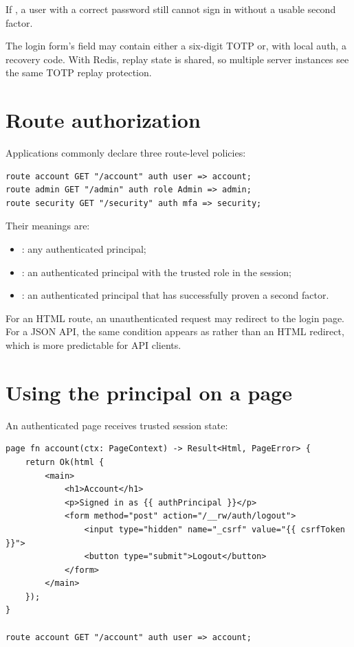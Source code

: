 If , a user with a correct password still cannot sign in without a usable second factor.

The login form's  field may contain either a six-digit TOTP or, with local auth, a recovery code. With Redis, replay state is shared, so multiple server instances see the same TOTP replay protection.

\section{Route authorization}

Applications commonly declare three route-level policies:

\begin{lstlisting}[language=RWLang]
route account GET "/account" auth user => account;
route admin GET "/admin" auth role Admin => admin;
route security GET "/security" auth mfa => security;
\end{lstlisting}

Their meanings are:

\begin{itemize}
  \item {}: any authenticated principal;
  \item {}: an authenticated principal with the trusted  role in the session;
  \item {}: an authenticated principal that has successfully proven a second factor.
\end{itemize}

For an HTML route, an unauthenticated request may redirect to the login page. For a JSON API, the same condition appears as  rather than an HTML redirect, which is more predictable for API clients.

\section{Using the principal on a page}

An authenticated page receives trusted session state:

\begin{lstlisting}[language=RWLang]
page fn account(ctx: PageContext) -> Result<Html, PageError> {
    return Ok(html {
        <main>
            <h1>Account</h1>
            <p>Signed in as {{ authPrincipal }}</p>
            <form method="post" action="/__rw/auth/logout">
                <input type="hidden" name="_csrf" value="{{ csrfToken }}">
                <button type="submit">Logout</button>
            </form>
        </main>
    });
}

route account GET "/account" auth user => account;
\end{lstlisting}

